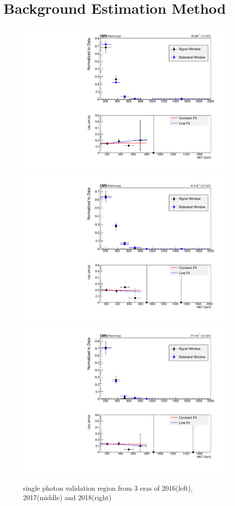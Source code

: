 \def \bkgestimationPlotsDir {plots/bkgestimation/}

\section{Background Estimation Method}
\label{sec:bkgest}





\begin{figure}[htbp!]
  \begin{center}
    \includegraphics[trim={5px 5px 5px 5px},clip,width=0.48\linewidth]{plots/bkgestimation/Data2016SingleLepton.pdf}\\
    \includegraphics[trim={5px 5px 5px 5px},clip,width=0.48\linewidth]{plots/bkgestimation/Data2017SingleLepton.pdf}
    \includegraphics[trim={5px 5px 5px 5px},clip,width=0.48\linewidth]{plots/bkgestimation/Data2018SingleLepton.pdf}
    \caption{single photon validation region from 3 eras of 2016(left), 2017(middle) and 2018(right)}
    \label{fig:DataSingleLepton}
  \end{center}
\end{figure} 

